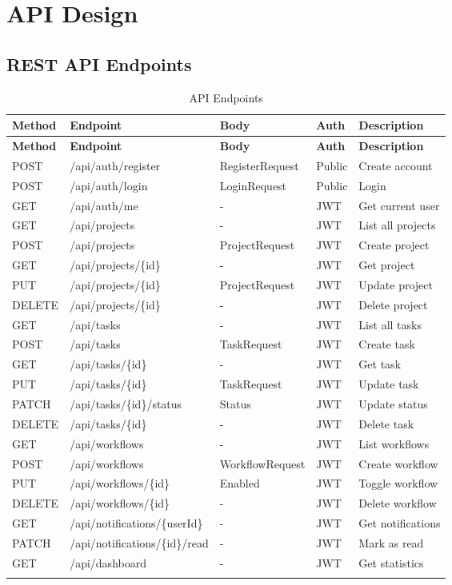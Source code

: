 \documentclass[12pt,a4paper,twoside]{book}
\begin{document}
\section{API Design}

\subsection{REST API Endpoints}

\begin{longtable}{|l|l|p{3cm}|l|p{3cm}|}
\hline
\textbf{Method} & \textbf{Endpoint} & \textbf{Body} & \textbf{Auth} & \textbf{Description} \\ \hline
\endfirsthead
\hline
\textbf{Method} & \textbf{Endpoint} & \textbf{Body} & \textbf{Auth} & \textbf{Description} \\ \hline
\endhead
POST & /api/auth/register & RegisterRequest & Public & Create account \\ \hline
POST & /api/auth/login & LoginRequest & Public & Login \\ \hline
GET & /api/auth/me & - & JWT & Get current user \\ \hline
GET & /api/projects & - & JWT & List all projects \\ \hline
POST & /api/projects & ProjectRequest & JWT & Create project \\ \hline
GET & /api/projects/\{id\} & - & JWT & Get project \\ \hline
PUT & /api/projects/\{id\} & ProjectRequest & JWT & Update project \\ \hline
DELETE & /api/projects/\{id\} & - & JWT & Delete project \\ \hline
GET & /api/tasks & - & JWT & List all tasks \\ \hline
POST & /api/tasks & TaskRequest & JWT & Create task \\ \hline
GET & /api/tasks/\{id\} & - & JWT & Get task \\ \hline
PUT & /api/tasks/\{id\} & TaskRequest & JWT & Update task \\ \hline
PATCH & /api/tasks/\{id\}/status & Status & JWT & Update status \\ \hline
DELETE & /api/tasks/\{id\} & - & JWT & Delete task \\ \hline
GET & /api/workflows & - & JWT & List workflows \\ \hline
POST & /api/workflows & WorkflowRequest & JWT & Create workflow \\ \hline
PUT & /api/workflows/\{id\} & Enabled & JWT & Toggle workflow \\ \hline
DELETE & /api/workflows/\{id\} & - & JWT & Delete workflow \\ \hline
GET & /api/notifications/\{userId\} & - & JWT & Get notifications \\ \hline
PATCH & /api/notifications/\{id\}/read & - & JWT & Mark as read \\ \hline
GET & /api/dashboard & - & JWT & Get statistics \\ \hline
\caption{API Endpoints}
\end{longtable}
\end{document}
